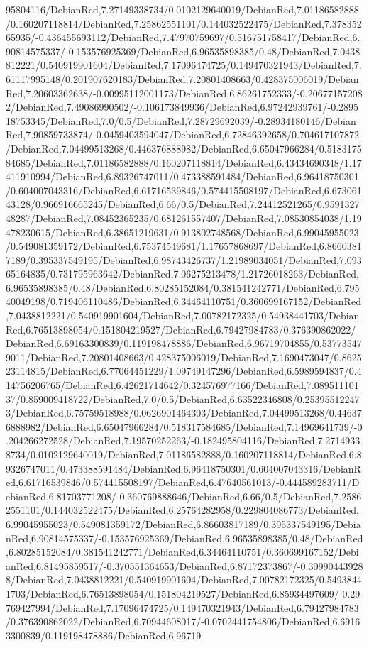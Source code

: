 {\begin{tikzternal}
95804116/DebianRed,7.27149338734/0.0102129640019/DebianRed,7.01186582888/0.160207118814/DebianRed,7.25862551101/0.144032522475/DebianRed,7.37835265935/-0.436455693112/DebianRed,7.47970759697/0.516751758417/DebianRed,6.90814575337/-0.153576925369/DebianRed,6.96535898385/0.48/DebianRed,7.0438812221/0.540919901604/DebianRed,7.17096474725/0.149470321943/DebianRed,7.61117995148/0.201907620183/DebianRed,7.20801408663/0.428375006019/DebianRed,7.20603362638/-0.00995112001173/DebianRed,6.86261752333/-0.206771572082/DebianRed,7.49086990502/-0.106173849936/DebianRed,6.97242939761/-0.289518753345/DebianRed,7.0/0.5/DebianRed,7.28729692039/-0.28934180146/DebianRed,7.90859733874/-0.0459403594047/DebianRed,6.72846392658/0.704617107872/DebianRed,7.04499513268/0.446376888982/DebianRed,6.65047966284/0.518317584685/DebianRed,7.01186582888/0.160207118814/DebianRed,6.43434690348/1.17411910994/DebianRed,6.89326747011/0.473388591484/DebianRed,6.96418750301/0.604007043316/DebianRed,6.61716539846/0.574415508197/DebianRed,6.67306143128/0.966916665245/DebianRed,6.66/0.5/DebianRed,7.24412521265/0.959132748287/DebianRed,7.08452365235/0.681261557407/DebianRed,7.08530854038/1.19478230615/DebianRed,6.38651219631/0.913802748568/DebianRed,6.99045955023/0.549081359172/DebianRed,6.75374549681/1.17657868697/DebianRed,6.86603817189/0.395337549195/DebianRed,6.98743426737/1.21989034051/DebianRed,7.09365164835/0.731795963642/DebianRed,7.06275213478/1.21726018263/DebianRed,6.96535898385/0.48/DebianRed,6.80285152084/0.381541242771/DebianRed,6.79540049198/0.719406110486/DebianRed,6.34464110751/0.360699167152/DebianRed,7.0438812221/0.540919901604/DebianRed,7.00782172325/0.54938441703/DebianRed,6.76513898054/0.151804219527/DebianRed,6.79427984783/0.376390862022/DebianRed,6.69163300839/0.119198478886/DebianRed,6.96719704855/0.537735479011/DebianRed,7.20801408663/0.428375006019/DebianRed,7.1690473047/0.862523114815/DebianRed,6.77064451229/1.09749147296/DebianRed,6.5989594837/0.414756206765/DebianRed,6.42621714642/0.324576977166/DebianRed,7.08951110137/0.859009418722/DebianRed,7.0/0.5/DebianRed,6.63522346808/0.253955122473/DebianRed,6.75759518988/0.0626901464303/DebianRed,7.04499513268/0.446376888982/DebianRed,6.65047966284/0.518317584685/DebianRed,7.14969641739/-0.204266272528/DebianRed,7.19570252263/-0.182495804116/DebianRed,7.27149338734/0.0102129640019/DebianRed,7.01186582888/0.160207118814/DebianRed,6.89326747011/0.473388591484/DebianRed,6.96418750301/0.604007043316/DebianRed,6.61716539846/0.574415508197/DebianRed,6.47640561013/-0.444589283711/DebianRed,6.81703771208/-0.360769888646/DebianRed,6.66/0.5/DebianRed,7.25862551101/0.144032522475/DebianRed,6.25764282958/0.229804086773/DebianRed,6.99045955023/0.549081359172/DebianRed,6.86603817189/0.395337549195/DebianRed,6.90814575337/-0.153576925369/DebianRed,6.96535898385/0.48/DebianRed,6.80285152084/0.381541242771/DebianRed,6.34464110751/0.360699167152/DebianRed,6.81495859517/-0.370551364653/DebianRed,6.87172373867/-0.309904439288/DebianRed,7.0438812221/0.540919901604/DebianRed,7.00782172325/0.54938441703/DebianRed,6.76513898054/0.151804219527/DebianRed,6.85934497609/-0.29769427994/DebianRed,7.17096474725/0.149470321943/DebianRed,6.79427984783/0.376390862022/DebianRed,6.70944608017/-0.0702441754806/DebianRed,6.69163300839/0.119198478886/DebianRed,6.96719
\end{tikzternal}}
